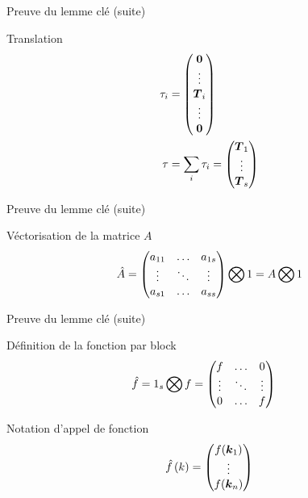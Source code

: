 \begin{frame}{Preuve du lemme clé (suite)}
\begin{block}{Translation}
 \begin{align*}
	\tau_i&=\begin{pmatrix}
			{\boldsymbol {0}}\\
			\vdots\\
			{\boldsymbol {T}}_{i}\\
			\vdots\\
			{\boldsymbol {0}}\\
	\end{pmatrix}
	\\
	\tau&=\sum_{i}\tau_{i}=\begin{pmatrix}
			{\boldsymbol {T}}_{1}\\
			\vdots\\
			{\boldsymbol {T}}_{s}\\
	\end{pmatrix}
\end{align*}
\end{block}
\end{frame}

\begin{frame}{Preuve du lemme clé (suite)}
  
 \begin{block}{Véctorisation de la matrice $A$}
  \begin{equation*}
\hat{A}=\begin{pmatrix}
    a_{11}	&\ldots	&a_{1s}\\
    \vdots	&\ddots	&\vdots\\
    a_{s1}	&\ldots	&a_{ss}\\
  \end{pmatrix} \bigotimes 1=A \bigotimes 1
\end{equation*}
 \end{block}

\end{frame}

\begin{frame}[<+->]{Preuve du lemme clé (suite)}
\begin{block}{Définition de la fonction par block}
 \begin{align*}
\hat{f}&=1_{s}\bigotimes f=\begin{pmatrix}f	&\ldots	&0\\
			\vdots &\ddots 	&\vdots\\
			0	&\ldots	&f\\
	\end{pmatrix}
\end{align*}
\end{block}
\begin{block}{Notation d'appel de fonction}
 \begin{equation*}
 \hat{f}\left(k\right)=\begin{pmatrix}f({\boldsymbol {k}}_1)\\
			\vdots\\
			f({\boldsymbol {k}}_n)\\
	\end{pmatrix}
\end{equation*}
\end{block}

\end{frame}

